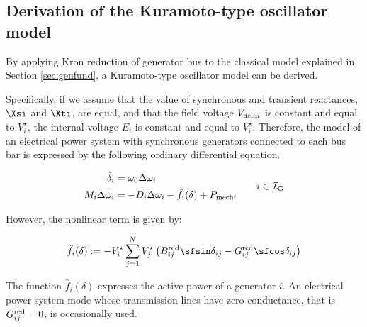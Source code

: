 \documentclass[graybox, envcountchap]{svmult}
\begin{document}
\subsection{Derivation of the Kuramoto-type oscillator model}\label{sec:kuramod}

By applying Kron reduction of generator bus to the classical model explained in
Section \ref{sec:genfund}, a Kuramoto-type oscillator model can be derived.

Specifically, if we assume that the value of synchronous and transient
reactances, $\Xsi$ and $\Xti$, are equal, and that the field voltage $V_{{\rm
field}i}$ is constant and equal to $V_i^{\star}$, the internal voltage $E_i$ is
constant and equal to $V_i^{\star}$. Therefore, the model of an electrical power
system with synchronous generators connected to each bus bar is expressed by the
following ordinary differential equation.

\begin{equation}\label{eq:clamod}
  \begin{aligned}
    \dot{\delta}_i&= \omega_0  \Delta \omega_i\\
    M_i   \Delta \dot{\omega}_i&= 
    - D_i \Delta\omega_i - 
    \hat{f}_i (\delta)
    +P_{{\rm mech}i} 
  \end{aligned}
  \qquad
  i\in \mathcal{I}_{\rm G}
\end{equation}

However, the nonlinear term is given by:

\[
  \hat{f}_i (\delta):=
  - V_i^{\star} \sum_{j=1}^{N}
  V_j^{\star}\left(
  B_{ij}^{\rm red}   \sfsin \delta_{ij}
  -
  G_{ij}^{\rm red}   \sfcos \delta_{ij}
  \right)
\]

The function $\hat{f}_i (\delta)$ expresses the active power of a generator $i$.
An electrical power system mode whose transmission lines have zero conductance,
that is $G_{ij}^{\rm red}=0$, is occasionally used.
\end{document}
